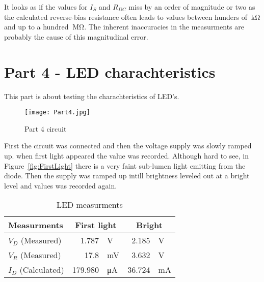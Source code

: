 \documentclass{article}
\begin{document}
It looks as if the values for \(I_S\) and \(R_{DC}\) miss by an order of magnitude or two as the calculated reverse-bias resistance often leads to values between hunders of \(\SI{}{\kilo\ohm}\) and up to a hundred \(\SI{}{\mega\ohm}\). The inherent inaccuracies in the measurments are probably the cause of this magnitudinal error.


\section{Part 4 - LED charachteristics}
This part is about testing the charachteristics of LED's. 


\begin{figure}[h]
    \centering
    \texttt{[image: Part4.jpg]}
    \caption{Part 4 circuit}
    \label{fig:Part4}
\end{figure}

First the circuit was connected and then the voltage supply was slowly ramped up. when first light appeared the value was recorded. Although hard to see, in Figure~\ref{fig:FirstLight} there is a very faint sub-lumen light emitting from the diode. Then the supply was ramped up intill brightness leveled out at a bright level and values was recorded again.

\clearpage


\begin{table}[htbp]
  \centering
  \caption{LED measurments}
    \begin{tabular}{|l|rl|rl|}
    \hline
    Measurments & \multicolumn{2}{c|}{First light} & \multicolumn{2}{c|}{Bright} \bigstrut\\
    \hline
    \(V_D\) (Measured)   & 1.787   & V   & 2.185  & V \bigstrut\\
    \hline
    \(V_R\) (Measured)   & 17.8    & mV  & 3.632  & V \bigstrut\\
    \hline
    \(I_D\) (Calculated) & 179.980 & μA  & 36.724 & mA \bigstrut\\
    \hline
    \end{tabular}%
  \label{tab:part4}%
\end{table}%
\end{document}
